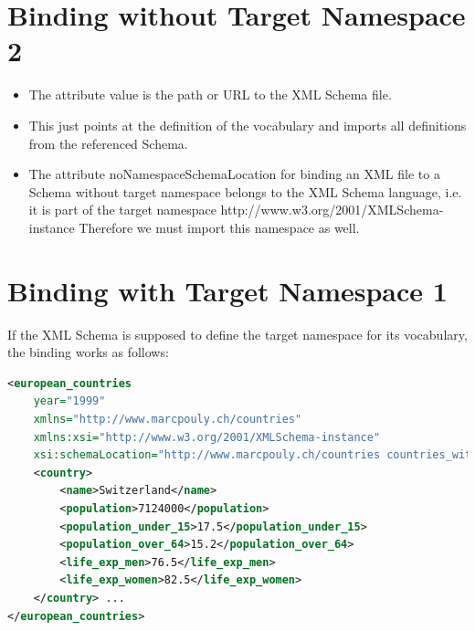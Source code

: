 \section{Binding without Target Namespace 2}
\begin{itemize}
\item The attribute value is the path or URL to the XML Schema file. \item This just points at the definition of the vocabulary and imports
all definitions from the referenced Schema.
\item The attribute noNamespaceSchemaLocation for binding an XML file to a Schema without target namespace belongs to the XML Schema language, i.e. it is part of the target namespace
http://www.w3.org/2001/XMLSchema-instance
Therefore we must import this namespace as well.
\end{itemize}

\section{Binding with Target Namespace 1}
If the XML Schema is supposed to define the target namespace  for its vocabulary,
the binding works as follows:
\begin{lstlisting}[language=XML, caption={Binding with Target Namespace 1}]
<european_countries 
	year="1999" 
	xmlns="http://www.marcpouly.ch/countries" 
	xmlns:xsi="http://www.w3.org/2001/XMLSchema-instance"
	xsi:schemaLocation="http://www.marcpouly.ch/countries countries_with_targetns.xsd">
	<country>
		<name>Switzerland</name> 
		<population>7124000</population> 
		<population_under_15>17.5</population_under_15> 
		<population_over_64>15.2</population_over_64> 
		<life_exp_men>76.5</life_exp_men> 
		<life_exp_women>82.5</life_exp_women>
	</country> ...
</european_countries>
\end{lstlisting}

